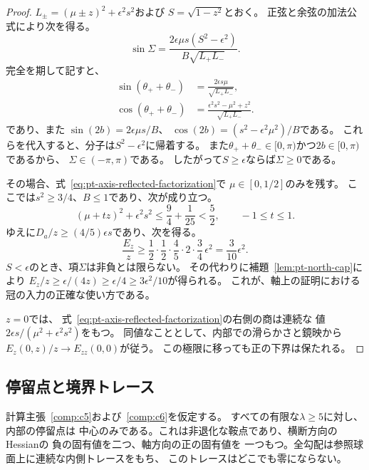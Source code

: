 \begin{proof}
$L_\pm=(\mu\pm z)^2+\epsilon^2s^2$および
$S=\sqrt{1-z^2}$とおく。
正弦と余弦の加法公式により次を得る。
\begin{equation}
 \sin\Sigma=
 \frac{2\epsilon\mu s(S^2-\epsilon^2)}
      {B\sqrt{L_+L_-}}.
\label{eq:pt-axis-angle-sum-sign}
\end{equation}
完全を期して記すと、
\[
\begin{aligned}
 \sin(\theta_++\theta_-)
 &=\frac{2\epsilon s\mu}{\sqrt{L_+L_-}},\\
 \cos(\theta_++\theta_-)
 &=\frac{\epsilon^2s^2-\mu^2+z^2}{\sqrt{L_+L_-}}.
\end{aligned}
\]
であり、また
$\sin(2b)=2\epsilon\mu s/B$、
$\cos(2b)=(s^2-\epsilon^2\mu^2)/B$である。
これらを代入すると、分子は$S^2-\epsilon^2$に帰着する。
また$\theta_++\theta_-\in[0,\pi)$かつ$2b\in[0,\pi)$であるから、
$\Sigma\in(-\pi,\pi)$である。
したがって$S\geq\epsilon$ならば$\Sigma\geq0$である。

その場合、式~\eqref{eq:pt-axis-reflected-factorization}で
$\mu\in[0,1/2]$のみを残す。
ここでは$s^2\geq3/4$、$B\leq1$であり、次が成り立つ。
\[
 (\mu+tz)^2+\epsilon^2s^2
 \leq\frac94+\frac1{25}<\frac52,
 \qquad -1\leq t\leq1.
\]
ゆえに$D_a/z\geq(4/5)\epsilon s$であり、次を得る。
\[
 \frac{E_z}{z}
 \geq\frac12\cdot\frac12\cdot
       \frac45\cdot2\cdot\frac34\,\epsilon^2
 =\frac3{10}\epsilon^2.
\]
$S<\epsilon$のとき、項$\Sigma$は非負とは限らない。
その代わりに補題~\ref{lem:pt-north-cap}により
$E_z/z\geq\epsilon/(4z)\geq\epsilon/4
\geq3\epsilon^2/10$が得られる。
これが、軸上の証明における冠の入力の正確な使い方である。

$z=0$では、
式~\eqref{eq:pt-axis-reflected-factorization}の右側の商は連続な
値$2\epsilon s/(\mu^2+\epsilon^2s^2)$をもつ。
同値なこととして、内部での滑らかさと鏡映から
$E_z(0,z)/z\to E_{zz}(0,0)$が従う。
この極限に移っても正の下界は保たれる。
\end{proof}

\subsection{停留点と境界トレース}
\label{subsec:pt-classification}

\begin{theorem}[C5とC6による扁長側の裾の分類]
\label{thm:pt-classification}
計算主張~\ref{comp:c5}および~\ref{comp:c6}を仮定する。
すべての有限な$\lambda\geq5$に対し、内部の停留点は
中心のみである。これは非退化な鞍点であり、横断方向のHessianの
負の固有値を二つ、軸方向の正の固有値を
一つもつ。全勾配は参照球面上に連続な内側トレースをもち、
このトレースはどこでも零にならない。
\end{theorem}

